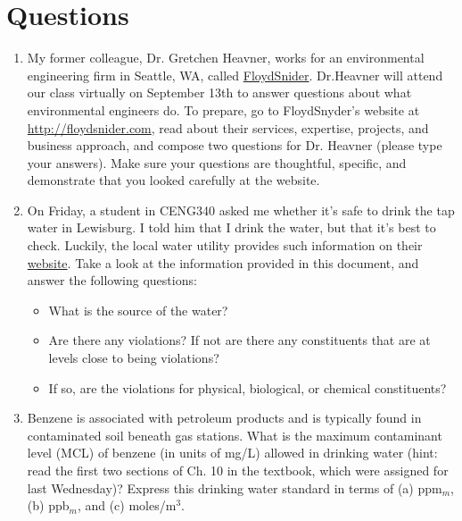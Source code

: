 \documentclass[12pt,letterpaper]{article}
\begin{document}
\section *{Questions}
\begin{enumerate}
\item My former colleague, Dr. Gretchen Heavner, works for an environmental engineering firm in Seattle, WA, called \href{http://floydsnider.com}{Floyd\textbar Snider}.  Dr.Heavner will attend our class virtually on September 13th to answer questions about what environmental engineers do.  To prepare, go to Floyd\textbar Snyder's website at \href{http://floydsnider.com}{http://floydsnider.com}, read about their services, expertise, projects, and business approach, and compose two questions for Dr. Heavner (please type your answers).  Make sure your questions are thoughtful, specific, and  demonstrate that you looked carefully at the website.  

\item On Friday, a student in CENG340 asked me whether it's safe to drink the tap water in Lewisburg. I told him that I drink the water, but that it's best to check.   Luckily, the local water utility provides such information on their \href{http://www.amwater.com/ccr/whitedeer.pdf}{website}.  Take a look at the information provided in this document, and answer the following questions:
\begin{itemize}
\item What is the source of the water?
\item Are there any violations?  If not are there any constituents that are at levels close to being violations?
\item If so, are the violations for physical, biological, or chemical constituents?
\end{itemize}


\item Benzene is associated with petroleum products and is typically found in contaminated soil beneath gas stations.  What is the maximum contaminant level (MCL) of benzene (in units of mg/L) allowed in drinking water (hint: read the first two sections of Ch. 10 in the textbook, which were assigned for last Wednesday)?  Express this drinking water standard in terms of (a) ppm$_m$, (b) ppb$_m$, and (c) moles/m$^3$.



\end{enumerate}
\end{document}
